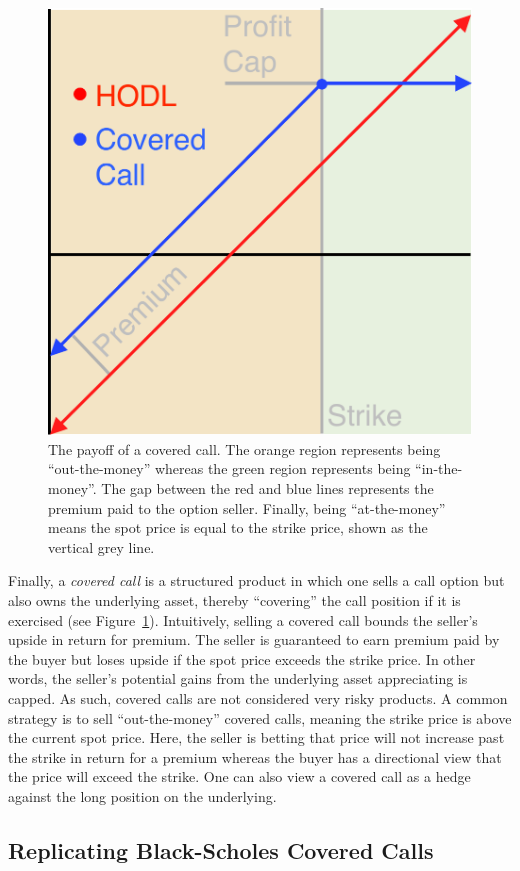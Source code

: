 \documentclass[hidelinks, 12pt]{article}
\begin{document}

\begin{figure}[h!]
    \centering
    \includegraphics[width=0.5\linewidth]{coveredcall.pdf}
    \caption{The payoff of a covered call. The orange  region represents being ``out-the-money'' whereas the green region represents being ``in-the-money''. The gap between the red and blue lines represents the premium paid to the option seller. Finally, being ``at-the-money'' means the spot price is equal to the strike price, shown as the vertical grey line.}
    \label{fig:covercall}
\end{figure}

Finally, a \textit{covered call} is a structured product in which one sells a call option but also owns the underlying asset, thereby ``covering'' the call position if it is exercised (see Figure~\ref{fig:covercall}). Intuitively, selling a covered call bounds the seller's upside in return for premium. The seller is guaranteed to earn premium paid by the buyer but loses upside if the spot price exceeds the strike price. In other words, the seller's potential gains from the underlying asset appreciating is capped. As such, covered calls are not considered very risky products. A common strategy is to sell ``out-the-money'' covered calls, meaning the strike price is above the current spot price. Here, the seller is betting that price will not increase past the strike in return for a premium whereas the buyer has a directional view that the price will exceed the strike. One can also view a covered call as a hedge against the long position on the underlying.

\subsection{Replicating Black-Scholes Covered Calls}
\label{sec:coveredcall}
\end{document}
